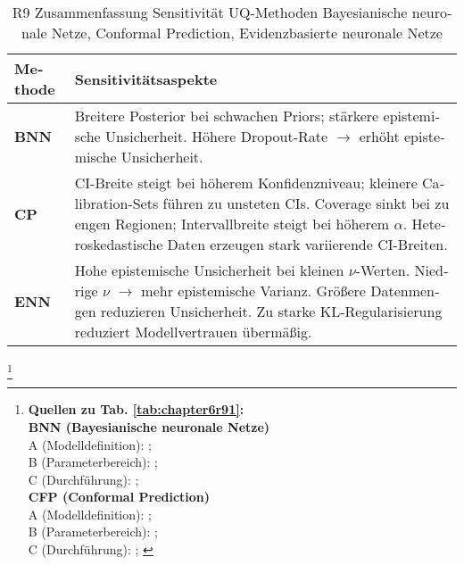 \begin{otherlanguage}{ngerman}
\begin{table}[!htbp]
\centering
\footnotesize
\begin{tabularx}{\textwidth}{|l|X|}
\hline
\textbf{Methode} & \textbf{Sensitivitätsaspekte} \\
\hline
\textbf{BNN} &
Breitere Posterior bei schwachen Priors; stärkere epistemische Unsicherheit. Höhere Dropout-Rate \(\rightarrow\) erhöht epistemische Unsicherheit. \\
\hline
\textbf{CP} &
CI-Breite steigt bei höherem Konfidenzniveau; kleinere Calibration-Sets führen zu unsteten CIs. Coverage sinkt bei zu engen Regionen; Intervallbreite steigt bei höherem \(\alpha\). Heteroskedastische Daten erzeugen stark variierende CI-Breiten. \\
\hline
\textbf{ENN} &
Hohe epistemische Unsicherheit bei kleinen \(\nu\)-Werten. Niedrige \(\nu\) \(\rightarrow\) mehr epistemische Varianz. Größere Datenmengen reduzieren Unsicherheit. Zu starke KL-Regularisierung reduziert Modellvertrauen übermäßig. \\
\hline
\end{tabularx}
\caption{R9 Zusammenfassung Sensitivität UQ-Methoden \gls{Bayesianische neuronale Netze}, \gls{Conformal Prediction}, \gls{Evidenzbasierte neuronale Netze}}
\label{tab:sensitivity_r9_transposed}
\end{table}



\footnote{%
\begin{minipage}[t]{\textwidth}
\scriptsize
\textbf{Quellen zu Tab. \ref{tab:chapter6r91}:}\\[0.5em]
\textbf{BNN (Bayesianische neuronale Netze)}\\
A (Modelldefinition): \parencite[Kap.~3]{blundell2015weight}; \parencite[S.~40–42]{gal2016uncertainty} \\
B (Parameterbereich): \parencite[S.~448–450]{mackay1992practical}; \parencite[Kap.~5]{rasmussen2006gaussian} \\
C (Durchführung): \parencite[S.~41–42]{gal2016uncertainty}; \parencite{blundell2015weight} \\[0.5em]

\textbf{CFP (Conformal Prediction)}\\
A (Modelldefinition): \parencite{angelopoulos2021gentle}; \parencite{shafer2008tutorial} \\
B (Parameterbereich): \parencite[S.~63–65]{shafer2008tutorial}; \parencite{vovk2005algorithmic} \\
C (Durchführung): \parencite{angelopoulos2021gentle}; \parencite{shafer2008tutorial}
\end{minipage}%
}


\end{otherlanguage}
